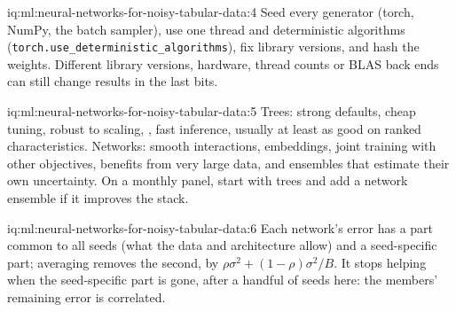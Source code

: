 \begin{solution}{iq:ml:neural-networks-for-noisy-tabular-data:4}
Seed every generator (torch, NumPy, the batch sampler), use one thread and deterministic algorithms
(\texttt{torch.use\_deterministic\_algorithms}),
fix library versions, and hash the weights. Different library versions, hardware, thread counts or BLAS back ends can
still change results in the last bits.
\end{solution}

\begin{solution}{iq:ml:neural-networks-for-noisy-tabular-data:5}
Trees: strong defaults, cheap tuning, robust to scaling, , fast inference, usually at least as good
on ranked characteristics. Networks: smooth interactions, embeddings, joint training with other objectives, benefits
from very large data, and ensembles that estimate their own uncertainty. On a monthly panel, start with trees and add a
network ensemble if it improves the stack.
\end{solution}

\begin{solution}{iq:ml:neural-networks-for-noisy-tabular-data:6}
Each network's error has a part common to all seeds (what the data and architecture allow) and a seed-specific part;
averaging removes the second, by $\rho\sigma^2 + (1-\rho)\sigma^2/B$. It stops helping when the seed-specific part is
gone, after a handful of seeds here: the members' remaining error is correlated.
\end{solution}
